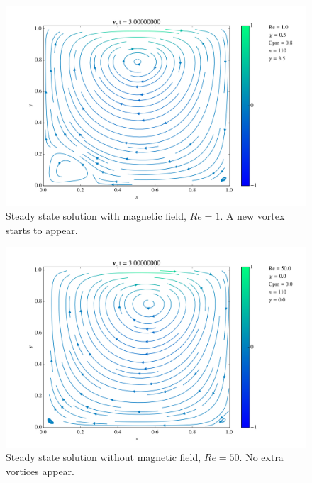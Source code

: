 \documentclass[journal]{IEEEtran}
\begin{document}
\begin{figure}[!t]
\centering
\includegraphics[width=\linewidth]{figures/Re001/w/vectorField}
\caption{Steady state solution with magnetic field, $\mathit{Re}=1$. A new vortex starts to appear. \label{Re001wVectorField}}
\end{figure}

\begin{figure}[!t]
\centering
\includegraphics[width=\linewidth]{figures/Re050/n/vectorField}
\caption{Steady state solution without magnetic field, $\mathit{Re}=50$. No extra vortices appear. \label{Re050nVectorField}}
\end{figure}
\end{document}
